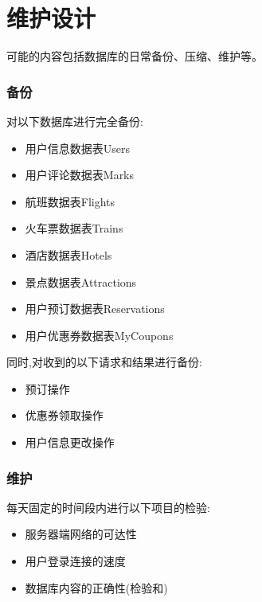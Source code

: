 \chapter{维护设计}
可能的内容包括数据库的日常备份、压缩、维护等。

\subsection{备份}

对以下数据库进行完全备份:
\begin{itemize}
	\item 用户信息数据表Users
	\item 用户评论数据表Marks
	\item 航班数据表Flights
	\item 火车票数据表Trains
	\item 酒店数据表Hotels
	\item 景点数据表Attractions
	\item 用户预订数据表Reservations
	\item 用户优惠券数据表MyCoupons
\end{itemize}


同时,对收到的以下请求和结果进行备份:
\begin{itemize}
	\item 预订操作
	\item 优惠券领取操作
	\item 用户信息更改操作
\end{itemize}

\subsection{维护}

每天固定的时间段内进行以下项目的检验:
\begin{itemize}
	\item 服务器端网络的可达性
	\item 用户登录连接的速度
	\item 数据库内容的正确性(检验和)
\end{itemize}